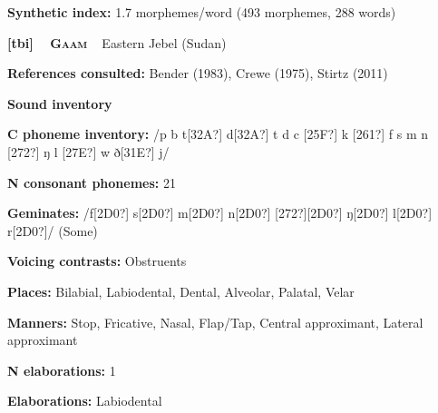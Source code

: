 \begin{styleBody}
\textbf{Synthetic index: }1.7 morphemes/word (493 morphemes, 288 words)
\end{styleBody}

\clearpage\begin{styleBody}
\textbf{[tbi] }\ \ \textbf{\textsc{Gaam}}\textbf{\ \ }Eastern Jebel (Sudan)
\end{styleBody}

\begin{styleBody}
\textbf{References consulted: }Bender (1983), Crewe (1975), Stirtz (2011)
\end{styleBody}

\begin{styleBody}
\textbf{Sound inventory}
\end{styleBody}

\begin{styleBody}
\textbf{C phoneme inventory:} /p b t[32A?] d[32A?] t d c [25F?] k [261?] f s m n [272?] ŋ l [27E?] w ð[31E?] j/
\end{styleBody}

\begin{styleBody}
\textbf{N consonant phonemes:} 21
\end{styleBody}

\begin{styleBody}
\textbf{Geminates:} /f[2D0?] s[2D0?] m[2D0?] n[2D0?] [272?][2D0?] ŋ[2D0?] l[2D0?] r[2D0?]/ (Some)
\end{styleBody}

\begin{styleBody}
\textbf{Voicing contrasts:} Obstruents
\end{styleBody}

\begin{styleBody}
\textbf{Places:} Bilabial, Labiodental, Dental, Alveolar, Palatal, Velar
\end{styleBody}

\begin{styleBody}
\textbf{Manners:} Stop, Fricative, Nasal, Flap/Tap, Central approximant, Lateral approximant
\end{styleBody}

\begin{styleBody}
\textbf{N elaborations:} 1
\end{styleBody}

\begin{styleBody}
\textbf{Elaborations:} Labiodental
\end{styleBody}

